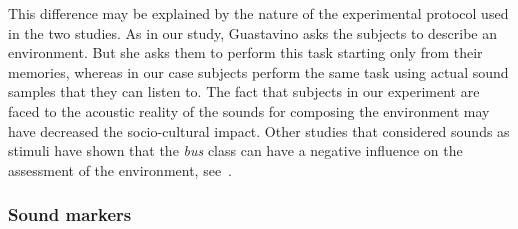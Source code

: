 \documentclass[12pt]{elsarticle}
\begin{document}
This difference may be explained by the nature of the experimental protocol used in the two studies. As in our study, Guastavino asks the subjects to describe an environment. But she asks them to perform this task starting only from their memories, whereas in our case subjects perform the same task using actual sound samples that they can listen to. The fact that subjects in our experiment are faced to the acoustic reality of the sounds for composing the environment may have decreased the socio-cultural impact. Other studies that considered sounds as stimuli have shown that the \emph{bus} class can have a negative influence on the assessment of the environment, see~\cite{lavandier2006contribution}.


\subsubsection*{Sound markers}
\end{document}
